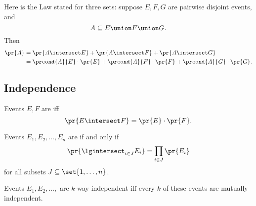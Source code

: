 \documentclass[handout]{mcs}
\begin{document}
{Here is the Law stated for three sets: suppose $E,F,G$ are pairwise
disjoint events, and
\[
A \subseteq E \union F \union G. 
\]
Then
\begin{align*}
\pr{A} & = \pr{A \intersect E}+ 
           \pr{A \intersect F}+ 
           \pr{A \intersect G}\\
 & = \prcond{A}{E} \cdot \pr{E} +
         \prcond{A}{F} \cdot \pr{F} +
         \prcond{A}{G} \cdot \pr{G}.
\end{align*}

\subsection*{Independence}

Events $E,F$ are  iff
\[
\pr{E \intersect F} = \pr{E}\cdot \pr{F}.
\]

Events $E_1, E_2, \dots, E_n$ are  if and only
if
%
\[
\pr{\lgintersect_{i \in J} E_i} = \prod_{i \in J} \pr{E_i}
\]
for all subsets $J \subseteq \set{1,\dots,n}$.

Events $E_1, E_2, \dots,$ are $k$-way independent iff every $k$
of these events are mutually independent.
}
\end{document}
